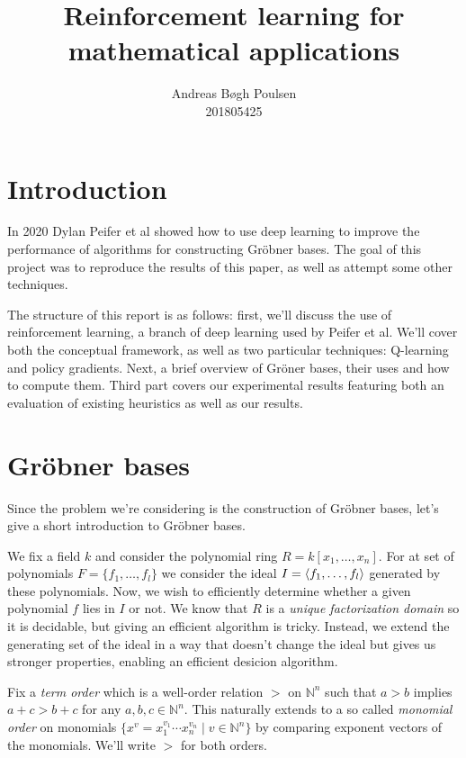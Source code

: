 \documentclass{article}
\title{Reinforcement learning for mathematical applications}
\author{
    Andreas Bøgh Poulsen\\
    201805425
}
\theoremstyle{changedot}
\theoremstyle{changedotbreak}
\theoremstyle{nonumberplain}
\DeclarePairedDelimiter{\tuple}{\langle}{\rangle}
\begin{document}
\maketitle

\section{Introduction}
In 2020 Dylan Peifer et al\cite{peifer} showed how to use deep learning to improve the performance of algorithms for constructing Gröbner bases. The goal of this project was to reproduce the results of this paper, as well as attempt some other techniques.

The structure of this report is as follows: first, we'll discuss the use of reinforcement learning, a branch of deep learning used by Peifer et al. We'll cover both the conceptual framework, as well as two particular techniques: Q-learning and policy gradients. Next, a brief overview of Gröner bases, their uses and how to compute them. Third part covers our experimental results featuring both an evaluation of existing heuristics as well as our results.

\section{Gröbner bases}

Since the problem we're considering is the construction of Gröbner bases, let's give a short introduction to Gröbner bases.

We fix a field $k$ and consider the polynomial ring $R = k[x_{1}, \dots, x_{n}]$. For at set of polynomials $F = \{f_{1}, \dots, f_{l}\}$ we consider the ideal $I = \tuple{f_{1}, \dots, f_{l}}$ generated by these polynomials. Now, we wish to efficiently determine whether a given polynomial $f$ lies in $I$ or not. We know that $R$ is a \emph{unique factorization domain} so it is decidable, but giving an efficient algorithm is tricky. Instead, we extend the generating set of the ideal in a way that doesn't change the ideal but gives us stronger properties, enabling an efficient desicion algorithm.

Fix a \emph{term order} which is a well-order relation $>$ on $\mathbb N^{n}$ such that $a > b$ implies $a + c > b + c$ for any $a, b, c \in \mathbb N^{n}$. This naturally extends to a so called \emph{monomial order} on monomials $\{x^{v} = x_{1}^{v_{1}} \cdots x_{n}^{v_{n}} \mid v \in \mathbb N^{n}\}$ by comparing exponent vectors of the monomials. We'll write $>$ for both orders.
\end{document}
